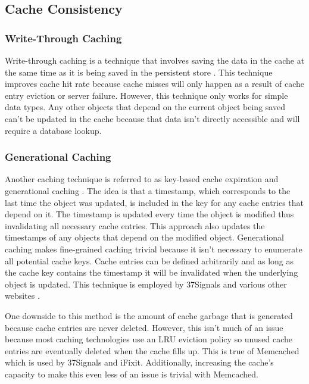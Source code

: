 \documentclass[12pt]{ucthesis}
\begin{document}
\subsection{Cache Consistency}
\subsubsection{Write-Through Caching}
Write-through caching is a technique that involves saving the data in the cache at the same time as it is being saved in the persistent store \cite{writeThroughCaching}.
This technique improves cache hit rate because cache misses will only happen as a result of cache entry eviction or server failure.
However, this technique only works for simple data types.
Any other objects that depend on the current object being saved can't be updated in the cache because that data isn't directly accessible and will require a database lookup.

\subsubsection{Generational Caching}
Another caching technique is referred to as key-based cache expiration \cite{keyBasedCacheExpiration} and generational caching \cite{generationalCaching}.
The idea is that a timestamp, which corresponds to the last time the object was updated, is included in the key for any cache entries that depend on it.
The timestamp is updated every time the object is modified thus invalidating all necessary cache entries.
This approach also updates the timestamps of any objects that depend on the modified object.
Generational caching makes fine-grained caching trivial because it isn't necessary to enumerate all potential cache keys.
Cache entries can be defined arbitrarily and as long as the cache key contains the timestamp it will be invalidated when the underlying object is updated.
This technique is employed by \textsf{37Signals} and various other websites \cite{keyBasedCacheExpiration}.

One downside to this method is the amount of cache garbage that is generated because cache entries are never deleted.
However, this isn't much of an issue because most caching technologies use an LRU eviction policy so unused cache entries are eventually deleted when the cache fills up.
This is true of \textsf{Memcached} which is used by \textsf{37Signals} and \textsf{iFixit}.
Additionally, increasing the cache's capacity to make this even less of an issue is trivial with \textsf{Memcached}.
\end{document}
